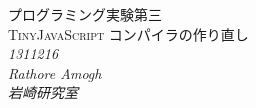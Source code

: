 \begin{titlepage}
   \begin{center}
      \textsc{\Huge プログラミング実験第三}\\ [1cm]
      \textsc{\Huge TinyJavaScript コンパイラの作り直し}\\ [1cm]
      \large\textit{\huge 1311216}\\
      \large\textit{\huge Rathore Amogh\\}
      \large\textit{\huge 岩崎研究室\\}
   \end{center}
\end{titlepage}
